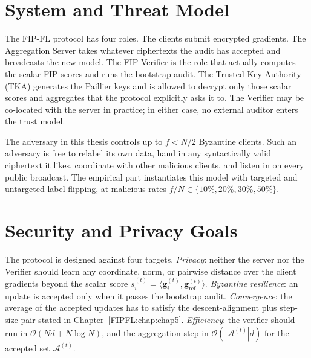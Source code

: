 \section{System and Threat Model}
\label{sec:prelim-threat}

The FIP-FL protocol has four roles. The clients submit encrypted gradients. The Aggregation Server takes whatever ciphertexts the audit has accepted and broadcasts the new model. The FIP Verifier is the role that actually computes the scalar FIP scores and runs the bootstrap audit. The Trusted Key Authority (TKA) generates the Paillier keys and is allowed to decrypt only those scalar scores and aggregates that the protocol explicitly asks it to. The Verifier may be co-located with the server in practice; in either case, no external auditor enters the trust model.

The adversary in this thesis controls up to $f<N/2$ Byzantine clients. Such an adversary is free to relabel its own data, hand in any syntactically valid ciphertext it likes, coordinate with other malicious clients, and listen in on every public broadcast. The empirical part instantiates this model with targeted and untargeted label flipping, at malicious rates $f/N\in\{10\%,20\%,30\%,50\%\}$.

\section{Security and Privacy Goals}
\label{sec:prelim-goals}

The protocol is designed against four targets. \emph{Privacy}: neither the server nor the Verifier should learn any coordinate, norm, or pairwise distance over the client gradients beyond the scalar score $s_i^{(t)}=\langle\mathbf{g}_i^{(t)},\mathbf{g}_{\mathrm{ref}}^{(t)}\rangle$. \emph{Byzantine resilience}: an update is accepted only when it passes the bootstrap audit. \emph{Convergence}: the average of the accepted updates has to satisfy the descent-alignment plus step-size pair stated in Chapter~\ref{FIPFL:chap:chap5}. \emph{Efficiency}: the verifier should run in $\mathcal{O}(Nd+N\log N)$, and the aggregation step in $\mathcal{O}(|\mathcal{A}^{(t)}|d)$ for the accepted set $\mathcal{A}^{(t)}$.
